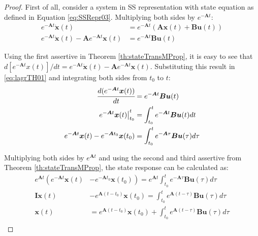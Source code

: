 \documentclass[a4paper,11pt]{book}
\numberwithin{figure}{chapter}
\numberwithin{equation}{chapter}
\numberwithin{table}{chapter}
\theoremstyle{definition}
\begin{document}
\begin{proof}
	First of all, consider a system in SS representation with state equation as defined in Equation \eqref{eq:SSRepr03}. Multiplying both sides by $e^{-\bm{A} t}$:
	\begin{equation} \label{eq:lagrTH01}
	\begin{split}
	    e^{-\bm{A} t} \dot{\bm{x}}(t) &= e^{-\bm{A} t} (\bm{A} \bm{x}(t) + \bm{B} \bm{u}(t)) \\
	    e^{-\bm{A} t} \dot{\bm{x}}(t) - \bm{A}e^{-\bm{A} t} \bm{x}(t)  &=  e^{-\bm{A} t} \bm{B} \bm{u}(t)
    \end{split}
	\end{equation}
	
	Using the first assertive in Theorem \ref{th:stateTransMProp}, it is easy to see that $d[e^{-\bm{A} t} x(t)]/dt = e^{-\bm{A} t} \dot{\bm{x}}(t) - \bm{A} e^{-\bm{A} t} \bm{x}(t)$. Substituting this result in \eqref{eq:lagrTH01} and integrating both sides from $t_0$ to $t$:
	\begin{equation} \label{eq:lagrTH02}
	\begin{split}
	    \cfrac{d(e^{-\bm{A} t} \bm{x}(t))}{dt} &= e^{-\bm{A} t} \bm{B} \bm{u}(t) \\
	    \left. e^{-\bm{A} t} \bm{x}(t) \right|^{t}_{t_0}  &= \int_{t_0}^{t} e^{-\bm{A} t} \bm{B} \bm{u}(t) dt \\
	    e^{-\bm{A} t} \bm{x}(t) - e^{-\bm{A} t_0} \bm{x}(t_0)  &= \int_{t_0}^{t} e^{-\bm{A} \tau} \bm{B} \bm{u}(\tau) d\tau
    \end{split}
	\end{equation}
	
	Multiplying both sides by $e^{\bm{A} t}$ and using the second and third assertive from Theorem \ref{th:stateTransMProp}, the state response can be calculated as:
	\begin{equation} \label{eq:lagrTH03}
	\begin{split}
	    e^{\bm{A} t} \left( e^{-\bm{A} t} \bm{x}(t) \right. &- \left. e^{-\bm{A} t_0} \bm{x}(t_0) \right) = e^{\bm{A} t} \int_{t_0}^{t} e^{-\bm{A} \tau} \bm{B} \bm{u}(\tau) d\tau \\
	    \bm{I} \bm{x}(t) &- e^{\bm{A} (t - t_0)} \bm{x}(t_0) = \int_{t_0}^{t} e^{\bm{A}(t - \tau)} \bm{B} \bm{u}(\tau) d\tau \\
	    \bm{x}(t) &= e^{\bm{A} (t - t_0)} \bm{x}(t_0) + \int_{t_0}^{t} e^{\bm{A}(t - \tau)} \bm{B} \bm{u}(\tau) d\tau \\
    \end{split}
	\end{equation}
	

\end{proof}
\end{document}
